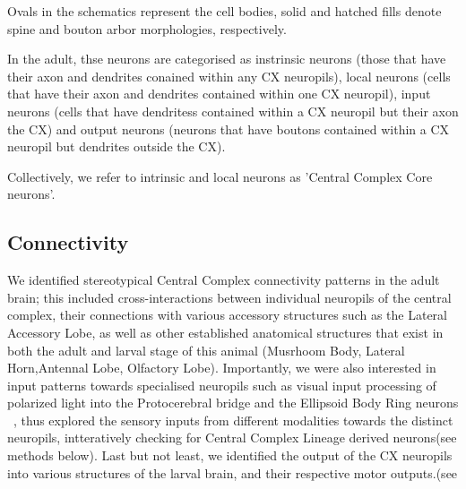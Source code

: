 \documentclass{article}
\begin{document}
 Ovals in the schematics represent the cell bodies, solid and hatched fills denote spine and bouton arbor morphologies, respectively.

In the adult, thse neurons are categorised as instrinsic neurons (those that have their axon and dendrites conained within any CX neuropils), local neurons (cells that have their axon and dendrites contained within one CX neuropil), input neurons (cells that have dendritess contained within a CX neuropil but their axon the CX) and output neurons (neurons that have boutons contained within a CX neuropil but dendrites outside the CX).

Collectively, we refer to intrinsic and local neurons as 'Central Complex Core neurons'. 
 
 
 \subsection{Connectivity}
   We identified stereotypical Central Complex connectivity patterns in the adult brain; this included cross-interactions between individual neuropils of the central complex, their connections with various accessory structures such as the Lateral Accessory Lobe, as well as other established anatomical structures that exist in both the adult and larval stage of this animal (Musrhoom Body, Lateral Horn,Antennal Lobe, Olfactory Lobe). Importantly, we were also interested in input patterns towards specialised neuropils such as visual input processing  of polarized light into the Protocerebral bridge and the Ellipsoid Body Ring neurons ~\citep{hardcastle2021visual, lin2013comprehensive, hulse2021connectome}, thus explored the sensory inputs from different modalities towards the distinct neuropils, intteratively checking for Central Complex Lineage derived neurons(see methods below). 
   Last but not least, we identified the output of the CX neuropils %
   into various structures of the larval brain, and their respective motor outputs.(see %
\end{document}
